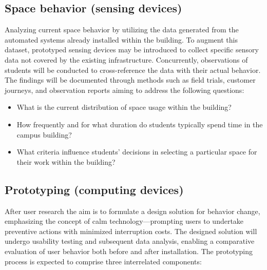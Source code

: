 \subsection{Space behavior (sensing devices)}

Analyzing current space behavior by utilizing the data generated from the automated systems already installed within the building. To augment this dataset, prototyped sensing devices may be introduced to collect specific sensory data not covered by the existing infrastructure. Concurrently, observations of students will be conducted to cross-reference the data with their actual behavior. The findings will be documented through methods such as field trials, customer journeys, and observation reports aiming to address the following questions:

\begin{itemize}
  \item What is the current distribution of space usage within the building?
  \item How frequently and for what duration do students typically spend time in the campus building?
  \item What criteria influence students' decisions in selecting a particular space for their work within the building?
\end{itemize}

\subsection{Prototyping (computing devices)}

After user research the aim is to formulate a design solution for behavior change, emphasizing the concept of calm technology—prompting users to undertake preventive actions with minimized interruption costs. The designed solution will undergo usability testing and subsequent data analysis, enabling a comparative evaluation of user behavior both before and after installation. The prototyping process is expected to comprise three interrelated components: \\

